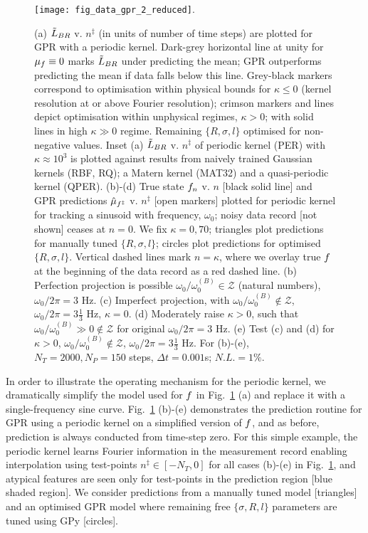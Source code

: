\begin{figure}
	\texttt{[image: fig\_data\_gpr\_2\_reduced]}. 
	\caption{\label{fig:main:fig_data_gpr} (a) $\tilde{L}_{BR}$ v. $n^\ddagger$ (in units of number of time steps) are plotted for GPR with a periodic kernel. Dark-grey horizontal line at unity for $\mu_f \equiv 0$ marks $\tilde{L}_{BR}$ under predicting the mean; GPR outperforms predicting the mean if data falls below this line. Grey-black markers correspond to optimisation within physical bounds for $\kappa \leq 0 $ (kernel resolution at or above Fourier resolution); crimson markers and lines depict optimisation within unphysical regimes, $\kappa >0$; with solid lines in high $\kappa \gg 0$ regime. Remaining  $\{R, \sigma, l\}$ optimised for non-negative values. Inset (a) $\tilde{L}_{BR}$ v. $n^\ddagger$ of periodic kernel (PER) with $\kappa \approx 10^3$ is plotted against results from naively trained Gaussian kernels (RBF, RQ); a Matern kernel (MAT32) and a quasi-periodic kernel (QPER). (b)-(d) True state $f_n$ v. $n$ [black solid line] and GPR predictions $\hat{\mu}_{f^\ddagger}$ v. $n^\ddagger$ [open markers]  plotted for periodic kernel for tracking a sinusoid with frequency, $\omega_0$; noisy data record [not shown] ceases at $n=0$. We fix $\kappa = 0, 70$; triangles plot predictions for manually tuned $\{R, \sigma, l\}$; circles plot predictions for optimised $\{R, \sigma, l\}$. Vertical dashed lines mark $n=\kappa$, where we overlay true $f$ at the beginning of the data record as a red dashed line. (b) Perfection projection is possible $\omega_0 / \omega_0^{(B)} \in \mathcal{Z}$ (natural numbers), $\omega_0/2\pi = 3$ Hz. (c) Imperfect projection, with $\omega_0 / \omega_0^{(B)} \notin \mathcal{Z}$, $\omega_0 / 2 \pi = 3 \frac{1}{3}$ Hz, $\kappa=0$. (d) Moderately raise $\kappa > 0 $, such that $\omega_0 / \omega_0^{(B)} \gg 0 \notin \mathcal{Z}$ for original $ \omega_0 / 2 \pi = 3$ Hz. (e) Test (c) and (d) for $\kappa > 0$, $ \omega_0 / \omega_0^{(B)} \notin \mathcal{Z}$, $\omega_0 / 2 \pi = 3 \frac{1}{3}$ Hz. For (b)-(e), $N_T = 2000, N_P = 150$ steps, $\Delta t = 0.001$s; $N.L.= 1\%$.}    	
\end{figure}

In order to illustrate the operating mechanism for the periodic kernel, we dramatically simplify the model used for $f$  in  Fig.~\ref{fig:main:fig_data_gpr} (a) and replace it with a single-frequency sine curve.  Fig.~\ref{fig:main:fig_data_gpr} (b)-(e) demonstrates the prediction routine for GPR using a periodic kernel on a simplified version of $f$, and as before, prediction is always conducted from time-step zero. For this simple example, the periodic kernel learns Fourier information in the measurement record enabling interpolation using test-points $n^{\ddagger} \in [-N_T, 0]$ for all cases (b)-(e) in Fig.~\ref{fig:main:fig_data_gpr}, and atypical features are seen only for test-points in the prediction region [blue shaded region]. We consider predictions from a manually tuned model [triangles] and an optimised GPR model where remaining free $\{\sigma, R, l \}$ parameters are tuned using GPy [circles]. 

